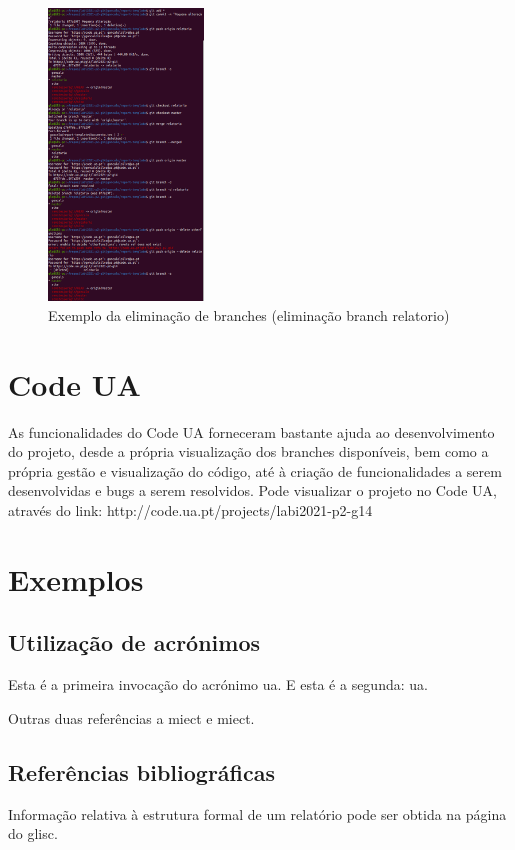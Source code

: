 \documentclass{report}
\begin{document}
\begin{figure}[!h]
\center 
\includegraphics[height=220pt]{img/git_2.png}
\caption{Exemplo da eliminação de branches (eliminação branch relatorio)}
\label{fig:git_d}
\end{figure}

\section{Code UA}
\label{sec:codeua}
As funcionalidades do Code UA forneceram bastante ajuda ao desenvolvimento do projeto, 
desde a própria visualização dos branches disponíveis, bem como a própria gestão e 
visualização do código, até à criação de funcionalidades a serem desenvolvidas e bugs 
a serem resolvidos. Pode visualizar o projeto no Code UA, através do 
link: http://code.ua.pt/projects/labi2021-p2-g14
\cite{codeua}

\section{Exemplos}

\subsection{Utilização de acrónimos}
\label{sec.util}
Esta é a primeira invocação do acrónimo \ac{ua}.
E esta é a segunda: \ac{ua}.


Outras duas referências a \ac{miect}
e \ac{miect}.

\subsection{Referências bibliográficas}
Informação relativa à estrutura formal de um relatório pode ser obtida
na página do \ac{glisc}\cite{glisc}.
\end{document}
